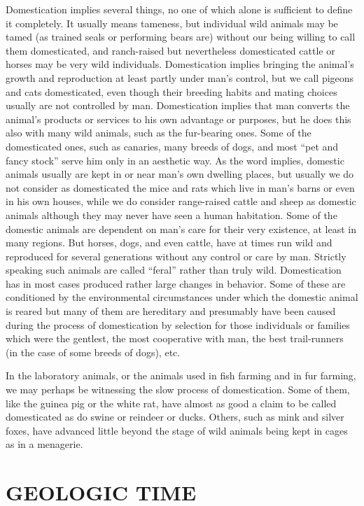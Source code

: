 Domestication implies several things, no one of which alone is sufficient to define it completely. It usually
means tameness, but individual wild animals may be tamed (as trained seals or performing bears are) without our
being willing to call them domesticated, and ranch-raised but nevertheless domesticated cattle or horses may be
very wild individuals. Domestication implies bringing the animal's growth and reproduction at least partly under
man's control, but we call pigeons and cats domesticated, even though their breeding habits and mating choices
usually are not controlled by man. Domestication implies that man converts the animal's products or services to
his own advantage or purposes, but he does this also with many wild animals, such as the fur-bearing ones. Some
of the domesticated ones, such as canaries, many breeds of dogs, and most ``pet and fancy stock'' serve him only
in an aesthetic way. As the word implies, domestic animals usually are kept in or near man's own dwelling places,
but usually we do not consider as domesticated the mice and rats which live in man's barns or even in his own
houses, while we do consider range-raised cattle and sheep as domestic animals although they may never have seen
a human habitation. Some of the domestic animals are dependent on man's care for their very existence, at least
in many regions. But horses, dogs, and even cattle, have at times run wild and reproduced for several generations
without any control or care by man. Strictly speaking such animals are called ``feral'' rather than truly wild.
Domestication has in most cases produced rather large changes in behavior. Some of these are conditioned by the
environmental circumstances under which the domestic animal is reared but many of them are hereditary and
presumably have been caused during the process of domestication by selection for those individuals or families
which were the gentlest, the most cooperative with man, the best trail-runners (in the case of some breeds of
dogs), etc.

In the laboratory animals, or the animals used in fish farming and in fur farming, we may perhaps be witnessing
the slow process of domestication. Some of them, like the guinea pig or the white rat, have almost as good a
claim to be called domesticated as do swine or reindeer or ducks. Others, such as mink and silver foxes, have
advanced little beyond the stage of wild animals being kept in cages as in a menagerie.

\section*{GEOLOGIC TIME}

